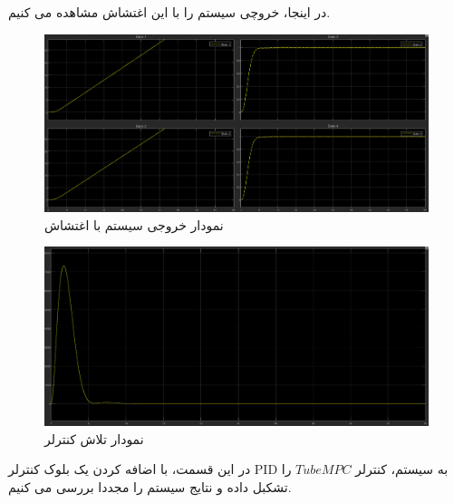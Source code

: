 در اینجا، خروچی سیستم را با این اغتشاش مشاهده می کنیم.
\begin{figure}
	\centering
	\includegraphics[width=1\linewidth]{../img/Q3_High_disturbance}
	\caption{نمودار خروجی سیستم با اغتشاش}
	\label{fig:q3highdisturbance}
\end{figure}
\begin{figure}
	\centering
	\includegraphics[width=1\linewidth]{../img/Q3_High_disturbance_Ceffort}
	\caption{نمودار تلاش کنترلر}
	\label{fig:q3highdisturbanceceffort}
\end{figure}
در این قسمت، با اضافه کردن یک بلوک کنترلر PID به سیستم، کنترلر $Tube MPC$ را تشکبل داده و نتایج سیستم را مجددا بررسی می کنیم.
















